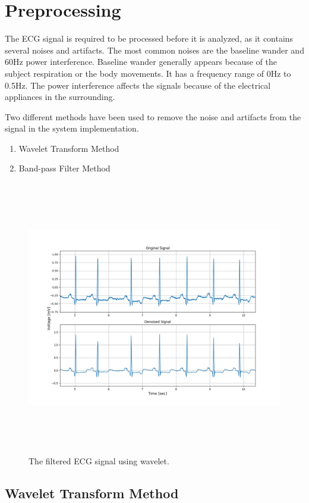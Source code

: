 \section{Preprocessing}
The ECG signal is required to be processed before it is analyzed, as it contains several noises and artifacts. The most common noises are the baseline wander and 60Hz power interference. Baseline wander generally appears because of the subject respiration or the body movements. It has a frequency range of 0Hz to 0.5Hz. The power interference affects the signals because of the electrical appliances in the surrounding.

Two different methods have been used to remove the noise and artifacts from the signal in the system implementation.

\begin{enumerate}
	\item Wavelet Transform Method
	\item Band-pass Filter Method
\end{enumerate}

\begin{figure}[h]
	\centering
	\includegraphics[width=15cm,height=12cm,keepaspectratio=true]{images/wavelet_denoised_1}
	\caption{
		The filtered ECG signal using wavelet.
	}
	\label{fig:wavelet_denoised}
\end{figure}


\subsection{Wavelet Transform Method}


